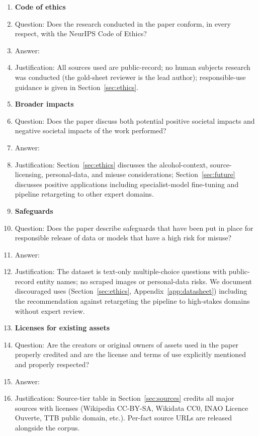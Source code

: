 \begin{enumerate}
\item {\bf Code of ethics}
    \item[] Question: Does the research conducted in the paper conform, in every respect, with the NeurIPS Code of Ethics?
    \item[] Answer: \answerYes{}
    \item[] Justification: All sources used are public-record; no human subjects research was conducted (the gold-sheet reviewer is the lead author); responsible-use guidance is given in Section~\ref{sec:ethics}.

\item {\bf Broader impacts}
    \item[] Question: Does the paper discuss both potential positive societal impacts and negative societal impacts of the work performed?
    \item[] Answer: \answerYes{}
    \item[] Justification: Section~\ref{sec:ethics} discusses the alcohol-context, source-licensing, personal-data, and misuse considerations; Section~\ref{sec:future} discusses positive applications including specialist-model fine-tuning and pipeline retargeting to other expert domains.

\item {\bf Safeguards}
    \item[] Question: Does the paper describe safeguards that have been put in place for responsible release of data or models that have a high risk for misuse?
    \item[] Answer: \answerYes{}
    \item[] Justification: The dataset is text-only multiple-choice questions with public-record entity names; no scraped images or personal-data risks. We document discouraged uses (Section~\ref{sec:ethics}, Appendix~\ref{app:datasheet}) including the recommendation against retargeting the pipeline to high-stakes domains without expert review.

\item {\bf Licenses for existing assets}
    \item[] Question: Are the creators or original owners of assets used in the paper properly credited and are the license and terms of use explicitly mentioned and properly respected?
    \item[] Answer: \answerYes{}
    \item[] Justification: Source-tier table in Section~\ref{sec:sources} credits all major sources with licenses (Wikipedia CC-BY-SA, Wikidata CC0, INAO Licence Ouverte, TTB public domain, etc.). Per-fact source URLs are released alongside the corpus.


\end{enumerate}
